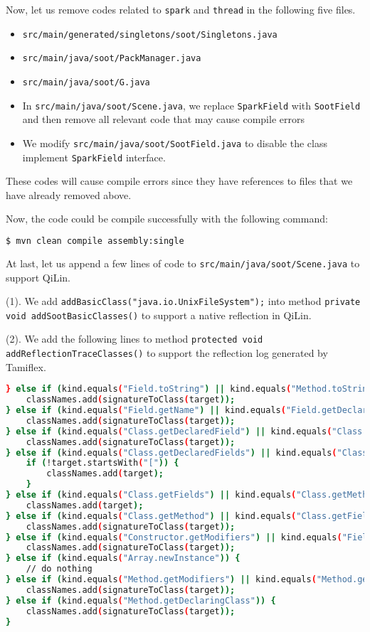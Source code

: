 \documentclass[11pt]{article}
\begin{document}
Now, let us remove codes related to \texttt{spark} and \texttt{thread} in the following five files.
\begin{itemize}
	\item  \texttt{src/main/generated/singletons/soot/Singletons.java} 
	\item \texttt{src/main/java/soot/PackManager.java} 
	\item \texttt{src/main/java/soot/G.java}
	\item In  \texttt{src/main/java/soot/Scene.java}, we replace \texttt{SparkField} with \texttt{SootField} and then remove all  relevant code that may cause compile errors
	\item We modify \texttt{src/main/java/soot/SootField.java} to disable the class implement \texttt{SparkField} interface.
\end{itemize}
These codes will cause compile errors since they have references to files that we have already removed above.

Now, the code could be compile successfully with the following command:
\begin{lstlisting}[language=bash, backgroundcolor = \color{lightgray},]
$ mvn clean compile assembly:single
\end{lstlisting}

At last, let us append a few lines of code to \texttt{src/main/java/soot/Scene.java} to support QiLin.

(1). We add \texttt{addBasicClass("java.io.UnixFileSystem");} into method \texttt{private void addSootBasicClasses()} to support a native reflection in QiLin. 

(2). We add the following lines to method \texttt{protected void addReflectionTraceClasses()} to support the reflection log generated by Tamiflex.

\begin{lstlisting}[language=bash, frame=single, basicstyle=\tiny]
} else if (kind.equals("Field.toString") || kind.equals("Method.toString") || kind.equals("Constructor.toString")) {
	classNames.add(signatureToClass(target));
} else if (kind.equals("Field.getName") || kind.equals("Field.getDeclaringClass")) {
	classNames.add(signatureToClass(target));
} else if (kind.equals("Class.getDeclaredField") || kind.equals("Class.getDeclaredMethod")) {
	classNames.add(signatureToClass(target));
} else if (kind.equals("Class.getDeclaredFields") || kind.equals("Class.getDeclaredMethods")) {
	if (!target.startsWith("[")) {
		classNames.add(target);
	}
} else if (kind.equals("Class.getFields") || kind.equals("Class.getMethods")) {
	classNames.add(target);
} else if (kind.equals("Class.getMethod") || kind.equals("Class.getField")) {
	classNames.add(signatureToClass(target));
} else if (kind.equals("Constructor.getModifiers") || kind.equals("Field.getModifiers")) {
	classNames.add(signatureToClass(target));
} else if (kind.equals("Array.newInstance")) {
	// do nothing
} else if (kind.equals("Method.getModifiers") || kind.equals("Method.getName") || kind.equals("Method.toGenericString")) {
	classNames.add(signatureToClass(target));
} else if (kind.equals("Method.getDeclaringClass")) {
	classNames.add(signatureToClass(target));
} 
\end{lstlisting}
\end{document}
